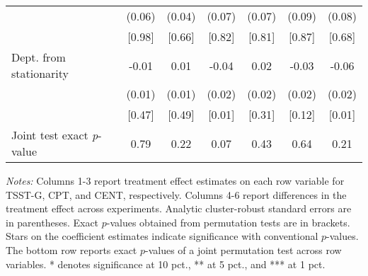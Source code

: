 \begin{table}[htbp]
{\begin{threeparttable}
\begin{tabular}{l*{6}{c}}
          &   (0.06)&   (0.04)&   (0.07)&   (0.07)&   (0.09)&   (0.08)\\
          &   [0.98]&   [0.66]&   [0.82]&   [0.81]&   [0.87]&   [0.68]\\
Dept. from stationarity&    -0.01&     0.01&-0.04\sym{***}&     0.02&-0.03\sym{*}&-0.06\sym{***}\\
          &   (0.01)&   (0.01)&   (0.02)&   (0.02)&   (0.02)&   (0.02)\\
          &   [0.47]&   [0.49]&[0.01\sym{***}]&   [0.31]&   [0.12]&[0.01\sym{**}]\\
\midrule Joint test exact \emph{p}-value&     0.79&     0.22&0.07\sym{*}&     0.43&     0.64&     0.21\\
\bottomrule \end{tabular} \begin{tablenotes}[flushleft] \footnotesize \item \emph{Notes:} Columns 1-3 report treatment effect estimates on each row variable for TSST-G, CPT, and CENT, respectively. Columns 4-6 report differences in the treatment effect across experiments. Analytic cluster-robust standard errors are in parentheses. Exact \(p\)-values obtained from permutation tests are in brackets. Stars on the coefficient estimates indicate significance with conventional \(p\)-values. The bottom row reports exact \(p\)-values of a joint permutation test across row variables. * denotes significance at 10 pct., ** at 5 pct., and *** at 1 pct. \end{tablenotes} \end{threeparttable} } \end{table}
